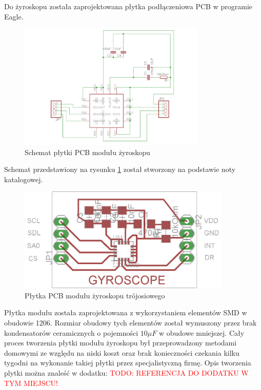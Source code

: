 Do żyroskopu została zaprojektowana płytka podłączeniowa PCB w programie Eagle.
\begin{figure}[!ht]
 \centering
 \includegraphics[height=60mm]{../images/ch04/L3G4200Dschematic.png}
 \caption{Schemat płytki PCB modułu żyroskopu}
 \label{fig:L3G4200DSchem}
\end{figure}

Schemat przedstawiony na rysunku \ref{fig:L3G4200DSchem} został stworzony na podstawie noty katalogowej.

\begin{figure}[!ht]
 \centering
 \includegraphics[height=50mm]{../images/ch04/L3G4200Dpcb.png}
 \caption{Płytka PCB modułu żyroskopu trójosiowego}
 \label{fig:L3G4200DPCB}
\end{figure}

Płytka modułu została zaprojektowana z wykorzystaniem elementów SMD w obudowie 1206. Rozmiar obudowy tych elementów został wymuszony przez brak kondensatorów ceramicznych o pojemności $10\mu F$ w obudowe mniejszej. Cały proces tworzenia płytki modułu żyroskopu był przeprowadzony metodami domowymi ze względu na niski koszt oraz brak konieczności czekania kilku tygodni na wykonanie takiej płytki przez specjalistyczną firmę. Opis tworzenia plytki można znaleść w dodatku: \textcolor{red}{TODO: REFERENCJA DO DODATKU W TYM MIEJSCU!}

